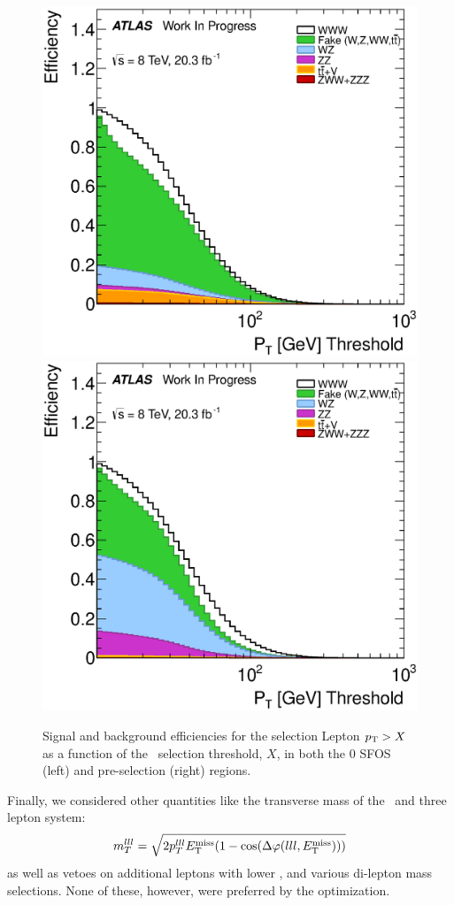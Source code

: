 \begin{figure}[ht!]
\centering
\includegraphics[width=0.45\columnwidth]{figures/optimization/SignalRegionsPreselection_0SFOS_Efficiencies/AllLeptonPt_Cumulative.eps}
\includegraphics[width=0.45\columnwidth]{figures/optimization/SignalRegions_0p5mmZ0_Preselection_Efficiencies/AllLeptonPt_Cumulative.eps}
\caption{ Signal and background efficiencies 
for the selection
Lepton $p_{\mathrm{T}} > X$
as a function of the \pt~selection
threshold, $X$, in both the 0 SFOS (left) and pre-selection (right) regions.  }
\label{fig:pt_eff}
\end{figure}

Finally, we considered other quantities like the 
transverse mass of the \MET~and three lepton system:
\begin{equation}
m_{T}^{lll} = \sqrt{2p_{T}^{lll}E_{\mathrm{T}}^{\mathrm{miss}}(1-\cos(\Delta\varphi(lll,E_{\mathrm{T}}^{\mathrm{miss}})))}
\end{equation}
as well as vetoes on additional leptons with lower \pt, and various
di-lepton mass selections.  None of these, however, were preferred
by the optimization.


